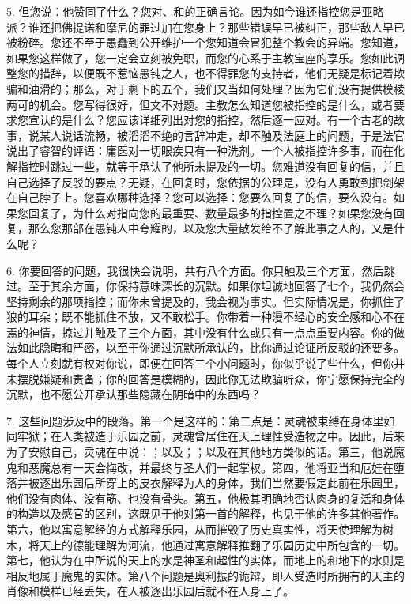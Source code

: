 5. 但您说：他赞同了什么？您对、和的正确言论。因为如今谁还指控您是亚略派？谁还把佛提诺和摩尼的罪过加在您身上？那些错误早已被纠正，那些敌人早已被粉碎。您还不至于愚蠢到公开维护一个您知道会冒犯整个教会的异端。您知道，如果您这样做了，您一定会立刻被免职，而您的心系于主教宝座的享乐。您如此调整您的措辞，以便既不惹恼愚钝之人，也不得罪您的支持者，他们无疑是标记着欺骗和油滑的；那么，对于剩下的五个，我们又当如何处理？因为它们没有提供模棱两可的机会。您写得很好，但文不对题。主教怎么知道您被指控的是什么，或者要求您宣认的是什么？您应该详细列出对您的指控，然后逐一应对。有一个古老的故事，说某人说话流畅，被滔滔不绝的言辞冲走，却不触及法庭上的问题，于是法官说出了睿智的评语：庸医对一切眼疾只有一种洗剂。一个人被指控许多事，而在化解指控时跳过一些，就等于承认了他所未提及的一切。您难道没有回复的信，并且自己选择了反驳的要点？无疑，在回复时，您依据的公理是，没有人勇敢到把剑架在自己脖子上。您喜欢哪种选择？您可以选择：您要么回复了的信，要么没有。如果您回复了，为什么对指向您的最重要、数量最多的指控置之不理？如果您没有回复，那么您那部在愚钝人中夸耀的，以及您大量散发给不了解此事之人的，又是什么呢？\par

6. 你要回答的问题，我很快会说明，共有八个方面。你只触及三个方面，然后跳过。至于其余方面，你保持意味深长的沉默。如果你坦诚地回答了七个，我仍然会坚持剩余的那项指控；而你未曾提及的，我会视为事实。但实际情况是，你抓住了狼的耳朵；既不能抓住不放，又不敢松手。你带着一种漫不经心的安全感和心不在焉的神情，掠过并触及了三个方面，其中没有什么或只有一点点重要内容。你的做法如此隐晦和严密，以至于你通过沉默所承认的，比你通过论证所反驳的还要多。每个人立刻就有权对你说，即便在回答三个小问题时，你似乎说了些什么，但你并未摆脱嫌疑和责备；你的回答是模糊的，因此你无法欺骗听众，你宁愿保持完全的沉默，也不愿公开承认那些隐藏在阴暗中的东西吗？\par

7. 这些问题涉及中的段落。第一个是这样的：第二点是：灵魂被束缚在身体里如同牢狱；在人类被造于乐园之前，灵魂曾居住在天上理性受造物之中。因此，后来为了安慰自己，灵魂在中说：；以及；；以及在其他地方类似的话。第三，他说魔鬼和恶魔总有一天会悔改，并最终与圣人们一起掌权。第四，他将亚当和厄娃在堕落并被逐出乐园后所穿上的皮衣解释为人的身体，我们当然要假定此前在乐园里，他们没有肉体、没有筋、也没有骨头。第五，他极其明确地否认肉身的复活和身体的构造以及感官的区别，这既见于他对第一首的解释，也见于他的许多其他著作。第六，他以寓意解经的方式解释乐园，从而摧毁了历史真实性，将天使理解为树木，将天上的德能理解为河流，他通过寓意解释推翻了乐园历史中所包含的一切。第七，他认为在中所说的天上的水是神圣和超性的实体，而地上的和地下的水则是相反地属于魔鬼的实体。第八个问题是奥利振的诡辩，即人受造时所拥有的天主的肖像和模样已经丢失，在人被逐出乐园后就不在人身上了。\par

